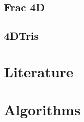 \documentclass{article}
\begin{document}
\subsection{Frac 4D}
\subsection{4DTris}

\section{Literature}
\subsection{}


\section{Algorithms}
\subsection{}




\end{document}
